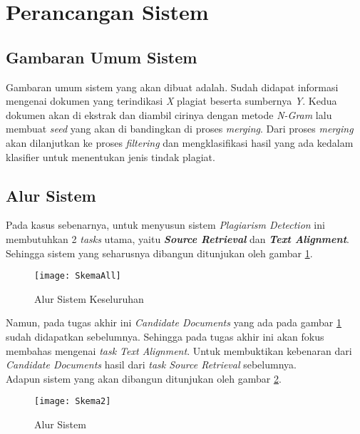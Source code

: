 \documentclass[../Proposal.tex]{subfiles}
\begin{document}
	\section{Perancangan Sistem}
	\subsection{Gambaran Umum Sistem}
	Gambaran umum sistem yang akan dibuat adalah. Sudah didapat informasi mengenai dokumen yang terindikasi \textit{X} plagiat beserta sumbernya \textit{Y}. Kedua dokumen akan di ekstrak dan diambil cirinya dengan metode \textit{N-Gram} lalu membuat \textit{seed} yang akan di bandingkan di proses \textit{merging}. Dari proses \textit{merging} akan dilanjutkan ke proses \textit{filtering} dan mengklasifikasi hasil yang ada kedalam klasifier untuk menentukan jenis tindak plagiat.
	
	\subsection{Alur Sistem}
	Pada kasus sebenarnya, untuk menyusun sistem \textit{Plagiarism Detection} ini membutuhkan 2 \textit{tasks} utama, yaitu \textit{\textbf{Source Retrieval}} dan \textbf{\textit{Text Alignment}}. Sehingga sistem yang seharusnya dibangun ditunjukan oleh gambar \ref{all-sistem}.
	
	\begin{figure}[h!]
		
		\texttt{[image: SkemaAll]}
		\caption[Dataset]{Alur Sistem Keseluruhan}
		\label{all-sistem}
	\end{figure}
	
	Namun, pada tugas akhir ini \textit{Candidate Documents} yang ada pada gambar \ref{all-sistem} sudah didapatkan sebelumnya. Sehingga pada tugas akhir ini akan fokus membahas mengenai \textit{task Text Alignment}. Untuk membuktikan kebenaran dari \textit{Candidate Documents} hasil dari \textit{task Source Retrieval} sebelumnya.\\
	
	Adapun sistem yang akan dibangun ditunjukan oleh gambar \ref{fig:alursistem}.
	
	\begin{figure}[h!]
		\texttt{[image: Skema2]}
		\caption[Alur Sistem]{Alur Sistem}
		\label{fig:alursistem}
	\end{figure}
\end{document}
